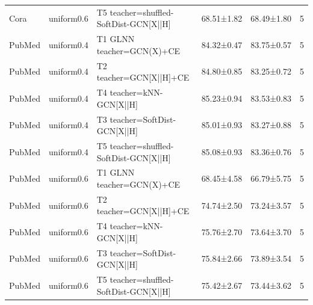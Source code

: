 \begin{table}[t]
\begin{tabular}{lllllr}
Cora & uniform0.6 & T5 teacher=shuffled-SoftDist-GCN[X||H] & 68.51±1.82 & 68.49±1.80 & 5 \\
PubMed & uniform0.4 & T1 GLNN teacher=GCN(X)+CE & 84.32±0.47 & 83.75±0.57 & 5 \\
PubMed & uniform0.4 & T2 teacher=GCN[X||H]+CE & 84.80±0.85 & 83.25±0.72 & 5 \\
PubMed & uniform0.4 & T4 teacher=kNN-GCN[X||H] & 85.23±0.94 & 83.53±0.83 & 5 \\
PubMed & uniform0.4 & T3 teacher=SoftDist-GCN[X||H] & 85.01±0.93 & 83.27±0.88 & 5 \\
PubMed & uniform0.4 & T5 teacher=shuffled-SoftDist-GCN[X||H] & 85.08±0.93 & 83.36±0.76 & 5 \\
PubMed & uniform0.6 & T1 GLNN teacher=GCN(X)+CE & 68.45±4.58 & 66.79±5.75 & 5 \\
PubMed & uniform0.6 & T2 teacher=GCN[X||H]+CE & 74.74±2.50 & 73.24±3.57 & 5 \\
PubMed & uniform0.6 & T4 teacher=kNN-GCN[X||H] & 75.76±2.70 & 73.64±3.70 & 5 \\
PubMed & uniform0.6 & T3 teacher=SoftDist-GCN[X||H] & 75.84±2.66 & 73.89±3.54 & 5 \\
PubMed & uniform0.6 & T5 teacher=shuffled-SoftDist-GCN[X||H] & 75.42±2.67 & 73.44±3.62 & 5 \\
\bottomrule
\end{tabular}
\end{table}

